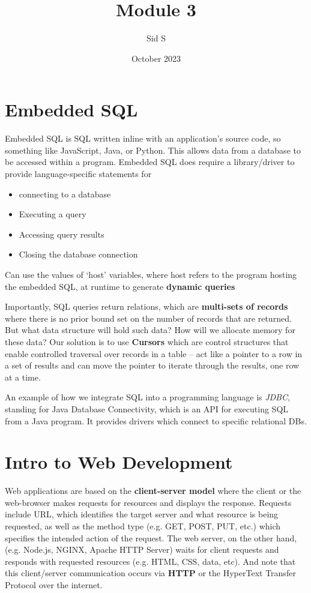 \documentclass{article}
\title{Module 3}
\author{Sid S}
\date{October 2023}
\begin{document}
\section*{Embedded SQL}
Embedded SQL is SQL written inline with an application's source code, so something like JavaScript, Java, or Python. This allows data from a database to be accessed within a program. Embedded SQL does require a library/driver to provide language-specific statements for \begin{itemize}
    \item connecting to a database
    \item Executing a query
    \item Accessing query results
    \item Closing the database connection

\end{itemize}
Can use the values of `host' variables, where host refers to the program hosting the embedded SQL, at runtime to generate \textbf{dynamic queries}

Importantly, SQL queries return relations, which are \textbf{multi-sets of records} where there is no prior bound set on the number of records that are returned. But what data structure will hold such data? How will we allocate memory for these data? Our solution is to use \textbf{Cursors} which are control structures that enable controlled traversal over records in a table -- act like a pointer to a row in a set of results and can move the pointer to iterate through the results, one row at a time.

An example of how we integrate SQL into a programming language is \textit{JDBC}, standing for Java Database Connectivity, which is an API for executing SQL from a Java program. It provides drivers which connect to specific relational DBs.

\section*{Intro to Web Development}
Web applications are based on the \textbf{client-server model} where the client or the web-browser makes requests for resources and displays the response. Requests include URL, which identifies the target server and what resource is being requested, as well as the method type (e.g. GET, POST, PUT, etc.) which specifies the intended action of the request. The web server, on the other hand, (e.g. Node.js, NGINX, Apache HTTP Server) waits for client requests and responds with requested resources (e.g. HTML, CSS, data, etc). And note that this client/server communication occurs via \textbf{HTTP} or the HyperText Transfer Protocol over the internet.
\end{document}
